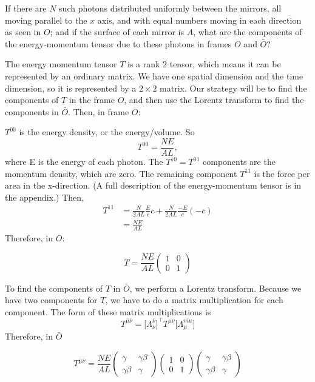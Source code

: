 \documentclass[11pt,largemargins]{homework}
\begin{document}
\begin{alphaparts}
\questionpart
If there are $N$ such photons distributed uniformly between the mirrors, all moving parallel to the $x$ axis, and with equal numbers moving in each direction as seen in $O$; and if the surface of each mirror is $A$, what are the components of the energy-momentum tensor due to these photons in frames $O$ and $\bar{O}$?

The energy momentum tensor $T$ is a rank 2 tensor, which means it can be represented by an ordinary matrix.  We have one spatial dimension and the time dimension, so it is represented by a $2 \times 2$ matrix.  Our strategy will be to find the components of $T$ in the frame $O$, and then use the Lorentz transform to find the components in $\bar{O}$. Then, in frame $O$: 

$T^{00}$ is the energy density, or the energy/volume.  So 
$$T^{00} = \frac{NE}{AL},$$ where E is the energy of each photon.  The $T^{10} = T^{01}$ components are the momentum density, which are zero.  The remaining component $T^{11}$ is the force per area in the x-direction.  (A full description of the energy-momentum tensor is in the appendix.) Then,
\begin{subequations}
\begin{align*}
T^{11} &= \frac{N}{2AL} \frac{E}{c} c + \frac{N}{2AL} \frac{-E}{c} (-c) \\
&= \frac{NE}{AL}
\end{align*}
\end{subequations}
Therefore, in $O$:

\begin{equation}
T = \frac{NE}{AL} \begin{pmatrix} 1 & 0 \\ 0 & 1 \end{pmatrix}
\end{equation}

To find the components of $T$ in $\bar{O}$, we perform a Lorentz transform.  Because we have two components for $T$, we have to do a matrix multiplication for each component.  The form of these matrix multiplications is
\begin{equation}
T^{\bar{\mu}\bar{\nu}} = \big[ \Lambda_{\nu}^{\bar{\nu}} \big]^{\top} T^{\mu \nu} \big[ \Lambda_{\mu}^{\bar{mu}} \big]
\end{equation}
Therefore, in $\bar{O}$

\begin{equation*}
T^{\bar{\mu} \bar{\nu}} = \frac{NE}{AL} \begin{pmatrix} \gamma & \gamma \beta \\ \gamma \beta & \gamma \end{pmatrix} \begin{pmatrix} 1 & 0 \\ 0 & 1 \end{pmatrix} \begin{pmatrix} \gamma & \gamma \beta \\ \gamma \beta & \gamma \end{pmatrix} 
\end{equation*}


\end{alphaparts}
\end{document}
